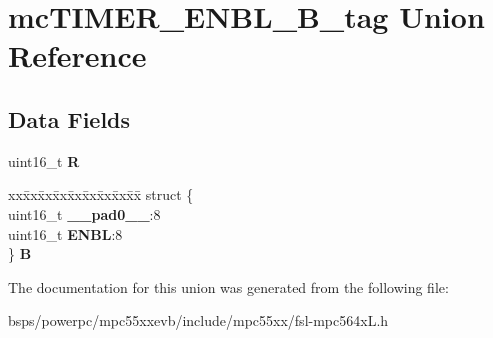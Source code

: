 \hypertarget{unionmcTIMER__ENBL__16B__tag}{}\section{mc\+T\+I\+M\+E\+R\+\_\+\+E\+N\+B\+L\+\_\+B\+\_\+tag Union Reference}
\label{unionmcTIMER__ENBL__16B__tag}
\subsection*{Data Fields}
\begin{DoxyCompactItemize}
\item 
\mbox{\label{unionmcTIMER__ENBL__16B__tag_a78e5684af302fe0a5e27580c2af2237e}} 
uint16\+\_\+t {\bfseries R}
\item 
\mbox{\label{unionmcTIMER__ENBL__16B__tag_a714afae0c74d8556c0a61f8749992383}} 
\begin{tabbing}
xx\=xx\=xx\=xx\=xx\=xx\=xx\=xx\=xx\=\kill
struct \{\\
\>uint16\_t {\bfseries \_\_pad0\_\_}:8\\
\>uint16\_t {\bfseries ENBL}:8\\
\} {\bfseries B}\\

\end{tabbing}\end{DoxyCompactItemize}


The documentation for this union was generated from the following file\+:\begin{DoxyCompactItemize}
\item 
bsps/powerpc/mpc55xxevb/include/mpc55xx/fsl-\/mpc564x\+L.\+h\end{DoxyCompactItemize}
